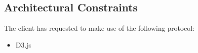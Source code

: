 \subsection{Architectural Constraints}
The client has requested to make use of the following protocol:
\begin{itemize}
	\item D3.js
\end{itemize}